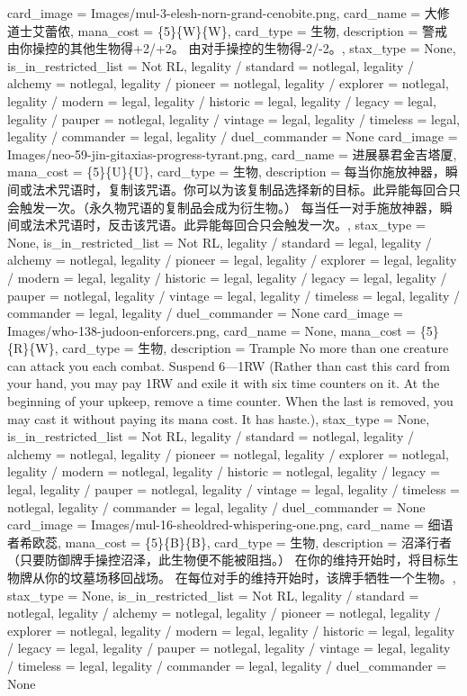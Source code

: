 \documentclass[lang = cn, color = black, 10pt]{AllThatStax}
\begin{document}
\card
{
	card_image = Images/mul-3-elesh-norn-grand-cenobite.png,
	card_name = 大修道士艾蕾侬,
	mana_cost = \{5\}\{W\}\{W\},
	card_type = 生物,
	description = 警戒
	由你操控的其他生物得+2/+2。
	由对手操控的生物得-2/-2。,
	stax_type = None,
	is_in_restricted_list = Not RL,
	legality / standard = notlegal,
	legality / alchemy = notlegal,
	legality / pioneer = notlegal,
	legality / explorer = notlegal,
	legality / modern = legal,
	legality / historic = legal,
	legality / legacy = legal,
	legality / pauper = notlegal,
	legality / vintage = legal,
	legality / timeless = legal,
	legality / commander = legal,
	legality / duel_commander = None
}
\card
{
	card_image = Images/neo-59-jin-gitaxias-progress-tyrant.png,
	card_name = 进展暴君金吉塔厦,
	mana_cost = \{5\}\{U\}\{U\},
	card_type = 生物,
	description = 每当你施放神器，瞬间或法术咒语时，复制该咒语。你可以为该复制品选择新的目标。此异能每回合只会触发一次。（永久物咒语的复制品会成为衍生物。）
	每当任一对手施放神器，瞬间或法术咒语时，反击该咒语。此异能每回合只会触发一次。,
	stax_type = None,
	is_in_restricted_list = Not RL,
	legality / standard = legal,
	legality / alchemy = notlegal,
	legality / pioneer = legal,
	legality / explorer = legal,
	legality / modern = legal,
	legality / historic = legal,
	legality / legacy = legal,
	legality / pauper = notlegal,
	legality / vintage = legal,
	legality / timeless = legal,
	legality / commander = legal,
	legality / duel_commander = None
}
\card
{
	card_image = Images/who-138-judoon-enforcers.png,
	card_name = None,
	mana_cost = \{5\}\{R\}\{W\},
	card_type = 生物,
	description = Trample
	No more than one creature can attack you each combat.
	Suspend 6—{1}{R}{W} (Rather than cast this card from your hand, you may pay {1}{R}{W} and exile it with six time counters on it. At the beginning of your upkeep, remove a time counter. When the last is removed, you may cast it without paying its mana cost. It has haste.),
	stax_type = None,
	is_in_restricted_list = Not RL,
	legality / standard = notlegal,
	legality / alchemy = notlegal,
	legality / pioneer = notlegal,
	legality / explorer = notlegal,
	legality / modern = notlegal,
	legality / historic = notlegal,
	legality / legacy = legal,
	legality / pauper = notlegal,
	legality / vintage = legal,
	legality / timeless = notlegal,
	legality / commander = legal,
	legality / duel_commander = None
}
\card
{
	card_image = Images/mul-16-sheoldred-whispering-one.png,
	card_name = 细语者希欧蕊,
	mana_cost = \{5\}\{B\}\{B\},
	card_type = 生物,
	description = 沼泽行者（只要防御牌手操控沼泽，此生物便不能被阻挡。）
	在你的维持开始时，将目标生物牌从你的坟墓场移回战场。
	在每位对手的维持开始时，该牌手牺牲一个生物。,
	stax_type = None,
	is_in_restricted_list = Not RL,
	legality / standard = notlegal,
	legality / alchemy = notlegal,
	legality / pioneer = notlegal,
	legality / explorer = notlegal,
	legality / modern = legal,
	legality / historic = legal,
	legality / legacy = legal,
	legality / pauper = notlegal,
	legality / vintage = legal,
	legality / timeless = legal,
	legality / commander = legal,
	legality / duel_commander = None
}
\end{document}
